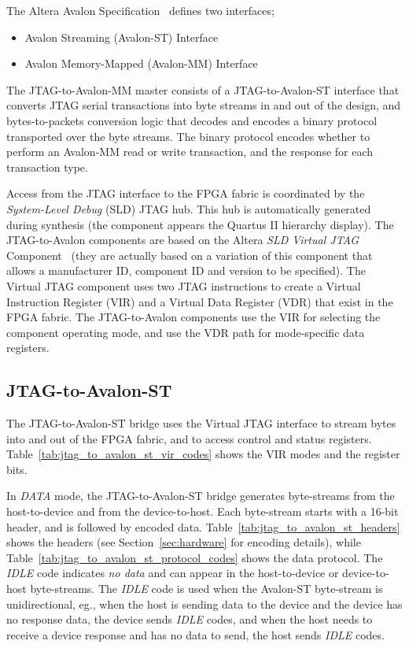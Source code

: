 \documentclass[10pt,twoside]{article}
\begin{document}
The Altera Avalon Specification~\cite{Altera_Interface_Specification_SOPC_2011,Altera_Interface_Specification_Qsys_2011} defines two interfaces;
%
\begin{itemize}
\item Avalon Streaming (Avalon-ST) Interface
\item Avalon Memory-Mapped (Avalon-MM) Interface
\end{itemize}
%
The JTAG-to-Avalon-MM master consists of a JTAG-to-Avalon-ST 
interface that converts JTAG serial transactions into byte streams in and
out of the design, and bytes-to-packets conversion logic that 
decodes and encodes a binary protocol transported over the byte
streams. The binary protocol encodes whether to perform an Avalon-MM
read or write transaction, and the response for each transaction 
type.

Access from the JTAG interface to the FPGA fabric is coordinated
by the {\em System-Level Debug} (SLD) JTAG hub. This hub is automatically
generated during synthesis (the component appears the Quartus II hierarchy 
display). The JTAG-to-Avalon components are based on the Altera
{\em SLD Virtual JTAG} Component~\cite{Altera_Virtual_JTAG_2008}
(they are actually based on a variation of this component that allows
a manufacturer ID, component ID and version to be specified).
The Virtual JTAG component uses two JTAG instructions to create
a Virtual Instruction Register (VIR) and a Virtual Data Register (VDR)
that exist in the FPGA fabric. The JTAG-to-Avalon components use the
VIR for selecting the component operating mode, and use the
VDR path for mode-specific data registers.

\subsection{JTAG-to-Avalon-ST}
\label{sec:jtag_to_avalon_st}

The JTAG-to-Avalon-ST bridge uses the Virtual JTAG interface to
stream bytes into and out of the FPGA fabric, and to access
control and status registers. 
Table~\ref{tab:jtag_to_avalon_st_vir_codes} shows the VIR modes
and the register bits.

In {\em DATA} mode, the JTAG-to-Avalon-ST bridge generates
byte-streams from the host-to-device and from the device-to-host.
Each byte-stream starts with a 16-bit header, and is followed
by encoded data.
Table~\ref{tab:jtag_to_avalon_st_headers} shows the headers
(see Section~\ref{sec:hardware} for encoding details),
while Table~\ref{tab:jtag_to_avalon_st_protocol_codes}
shows the data protocol. 
The {\em IDLE} code indicates {\em no data} and can appear in 
the host-to-device or device-to-host byte-streams.
The {\em IDLE} code is used when the Avalon-ST byte-stream
is unidirectional, eg., when the host is sending data to the
device and the device has no response data, the device sends
{\em IDLE} codes, and when the host needs to receive a
device response and has no data to send, the host sends
{\em IDLE} codes.
\end{document}
